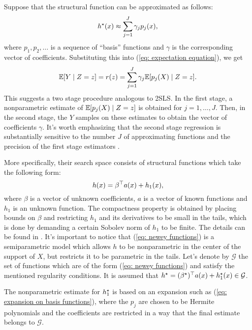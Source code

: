 Suppose that the structural function can be approximated as follows:
\begin{equation}
    \label{eq: expansion on basis functions}
    h^{ \star } ( x ) \approx \sum_{ j=1 }^{ J } \gamma_{ j } p_{ j } ( x )
,\end{equation}
where $ p_{ 1 }, p_{ 2 }, \dots $ is a sequence of ``basis'' functions and $ \gamma $ is the corresponding vector of coefficients.
Substituting this into (\ref{eq: expectation equation}), we get
\begin{equation}
    \label{eq: projected expansion}
    \mathbb{E} [ Y \mid Z = z ] = r ( z ) = \sum_{ j=1 }^{ J } \gamma_{ j } \mathbb{E} [ p_{ j } ( X ) \mid Z = z ]
.\end{equation}
This suggests a two stage procedure analogous to 2SLS.
In the first stage, a nonparametric estimate of $ \mathbb{E} [ p_{ j } ( X ) \mid Z = z ] $ is obtained for $ j = 1, \dots, J $.
Then, in the second stage, the $ Y $ samples on these estimates to obtain the vector of coefficients $ \gamma $.
It's worth emphasizing that the second stage regression is substantially sensitive to the number $ J $ of approximating functions and the precision of the first stage estimators \cite{newey2003}.

More specifically, their search space consists of structural functions which take the following form:
\begin{equation}
    \label{eq: newey functions}
    h ( x ) = \beta^{ \top } a ( x ) + h_{ 1 } ( x )
,\end{equation}
where $ \beta $ is a vector of unknown coefficients, $ a $ is a vector of known functions and $ h_{ 1 } $ is an unknown function.
The compactness property is obtained by placing bounds on $ \beta $ and restricting $ h_{ 1 } $ and its derivatives to be small in the tails, which is done by demanding a certain Sobolev norm of $ h_{ 1 } $ to be finite.
The details can be found in \cite{newey2003}.
It's important to notice that (\ref{eq: newey functions}) is a semiparametric model which allows $ h $ to be nonparametric in the center of the support of $ X $, but restricts it to be parametric in the tails.
Let's denote by $ \mathcal{G} $ the set of functions which are of the form (\ref{eq: newey functions}) and satisfy the mentioned regularity conditions.
It is assumed that $ h^{ \star } = ( \beta^{ \star } ) ^{ \top } a ( x ) + h^{ \star }_{ 1 } ( x ) \in \mathcal{G} $.

The nonparametric estimate for $ h^{ \star }_{ 1 } $ is based on an expansion such as (\ref{eq: expansion on basis functions}), where the $ p_{ j } $ are chosen to be Hermite polynomials and the coefficients are restricted in a way that the final estimate belongs to $ \mathcal{G} $.

